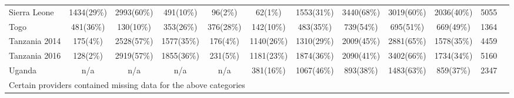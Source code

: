 \begin{tabular}{l*{11}{c}}
Sierra Leone&      {1434(29\%)}&    {2993(60\%)}&    {491(10\%)}&     {96(2\%)}&             {62(1\%)}&    {1553(31\%)}&        {3440(68\%)}&             {3019(60\%)}&               {2036(40\%)}&             {5055}\\
Togo&                  {481(36\%)}&        {130(10\%)}&    {353(26\%)}&     {376(28\%)}&             {142(10\%)}&  {483(35\%)}&        {739(54\%)}&             {695(51\%)}&             {669(49\%)}&             {1364}\\
Tanzania 2014&     {175(4\%)}&  {2528(57\%)}&    {1577(35\%)}&     {176(4\%)}&             {1140(26\%)}&  {1310(29\%)}&        {2009(45\%)}&             {2881(65\%)}&             {1578(35\%)}&             {4459}\\
Tanzania 2016&     {128(2\%)}&  {2919(57\%)}&    {1855(36\%)}&     {231(5\%)}&             {1181(23\%)}&  {1874(36\%)}&        {2090(41\%)}&             {3402(66\%)}&             {1734(34\%)}&             {5160}\\
Uganda&                {n/a}&                           {n/a}&                                 {n/a}&                                  {n/a}&                                  {381(16\%)}&  {1067(46\%)}&        {893(38\%)}&             {1483(63\%)}&             {859(37\%)}&             {2347}\\
\hline\hline
\multicolumn{11}{l}{\footnotesize Certain providers contained missing data for the above categories}\\
\end{tabular}